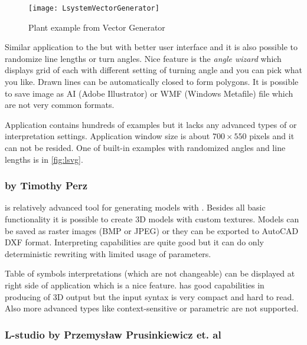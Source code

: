 \begin{wrapfigure}{r}{0.4\textwidth}
	\vspace{-20pt}
	\texttt{[image: LsystemVectorGenerator]}
	\caption{Plant example from \lsystem Vector Generator}
	\label{fig:lsvg}
\end{wrapfigure}

\noindent
Similar application to the  but with better user interface and it is also possible to randomize line lengths or turn angles.
Nice feature is the \emph{angle wizard} which displays grid of \lsystems each with different setting of turning angle and you can pick what you like. %
Drawn lines can be automatically closed to form polygons.
It is possible to save image as AI (Adobe Illustrator) or WMF (Windows Metafile) file which are not very common formats.

Application contains hundreds of examples but it lacks any advanced types of \lsystems or interpretation settings.
Application window size is about $700 \times 550$ pixels and it can not be resided.
One of built-in examples with randomized angles and line lengths is in \autoref{fig:lsvg}.


\subsubsection{ by Timothy Perz}

\noindent
{} is relatively advanced tool for generating models with \lsystems.
Besides all basic functionality it is possible to create 3D models with custom textures.
Models can be saved as raster images (BMP or JPEG) or they can be exported to AutoCAD DXF format.
Interpreting capabilities are quite good but it can do only deterministic rewriting with limited usage of parameters.

Table of symbols interpretations (which are not changeable) can be displayed at right side of application which is a nice feature.
 has good capabilities in producing of 3D output but the input syntax is very compact and hard to read.
Also more advanced \lsystem types like context-sensitive or parametric \lsystems are not supported.

\newcommand{\lstudio}{\mbox{L-studio}\xspace}

\subsubsection{\lstudio by Przemysław Prusinkiewicz et. al}

